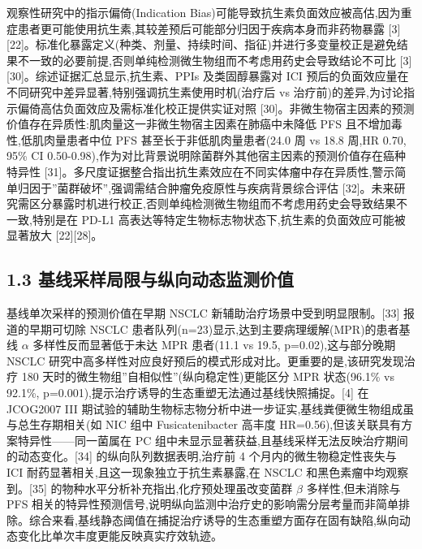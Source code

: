 \documentclass[11pt]{article}
\begin{document}
观察性研究中的指示偏倚(Indication Bias)可能导致抗生素负面效应被高估,因为重症患者更可能使用抗生素,其较差预后可能部分归因于疾病本身而非药物暴露 {[}3{]}{[}22{]}。标准化暴露定义(种类、剂量、持续时间、指征)并进行多变量校正是避免结果不一致的必要前提,否则单纯检测微生物组而不考虑用药史会导致结论不可比 {[}3{]}{[}30{]}。综述证据汇总显示,抗生素、PPIs 及类固醇暴露对 ICI 预后的负面效应量在不同研究中差异显著,特别强调抗生素使用时机(治疗后 vs 治疗前)的差异,为讨论指示偏倚高估负面效应及需标准化校正提供实证对照 {[}30{]}。非微生物宿主因素的预测价值存在异质性:肌肉量这一非微生物宿主因素在肺癌中未降低 PFS 且不增加毒性,低肌肉量患者中位 PFS 甚至长于非低肌肉量患者(24.0 周 vs 18.8 周,HR 0.70, 95\% CI 0.50-0.98),作为对比背景说明除菌群外其他宿主因素的预测价值存在癌种特异性 {[}31{]}。多尺度证据整合指出抗生素效应在不同实体瘤中存在异质性,警示简单归因于''菌群破坏'',强调需结合肿瘤免疫原性与疾病背景综合评估 {[}32{]}。未来研究需区分暴露时机进行校正,否则单纯检测微生物组而不考虑用药史会导致结果不一致,特别是在 PD-L1 高表达等特定生物标志物状态下,抗生素的负面效应可能被显著放大 {[}22{]}{[}28{]}。

\subsection{1.3 基线采样局限与纵向动态监测价值}\label{ux57faux7ebfux91c7ux6837ux5c40ux9650ux4e0eux7eb5ux5411ux52a8ux6001ux76d1ux6d4bux4ef7ux503c}

基线单次采样的预测价值在早期 NSCLC 新辅助治疗场景中受到明显限制。{[}33{]} 报道的早期可切除 NSCLC 患者队列(n=23)显示,达到主要病理缓解(MPR)的患者基线 \(\alpha\) 多样性反而显著低于未达 MPR 患者(11.1 vs 19.5, p=0.02),这与部分晚期 NSCLC 研究中高多样性对应良好预后的模式形成对比。更重要的是,该研究发现治疗 180 天时的微生物组''自相似性''(纵向稳定性)更能区分 MPR 状态(96.1\% vs 92.1\%, p=0.001),提示治疗诱导的生态重塑无法通过基线快照捕捉。{[}4{]} 在 JCOG2007 III 期试验的辅助生物标志物分析中进一步证实,基线粪便微生物组成虽与总生存期相关(如 NIC 组中 Fusicatenibacter 高丰度 HR=0.56),但该关联具有方案特异性------同一菌属在 PC 组中未显示显著获益,且基线采样无法反映治疗期间的动态变化。{[}34{]} 的纵向队列数据表明,治疗前 4 个月内的微生物稳定性丧失与 ICI 耐药显著相关,且这一现象独立于抗生素暴露,在 NSCLC 和黑色素瘤中均观察到。{[}35{]} 的物种水平分析补充指出,化疗预处理虽改变菌群 \(\beta\) 多样性,但未消除与 PFS 相关的特异性预测信号,说明纵向监测中治疗史的影响需分层考量而非简单排除。综合来看,基线静态阈值在捕捉治疗诱导的生态重塑方面存在固有缺陷,纵向动态变化比单次丰度更能反映真实疗效轨迹。
\end{document}
